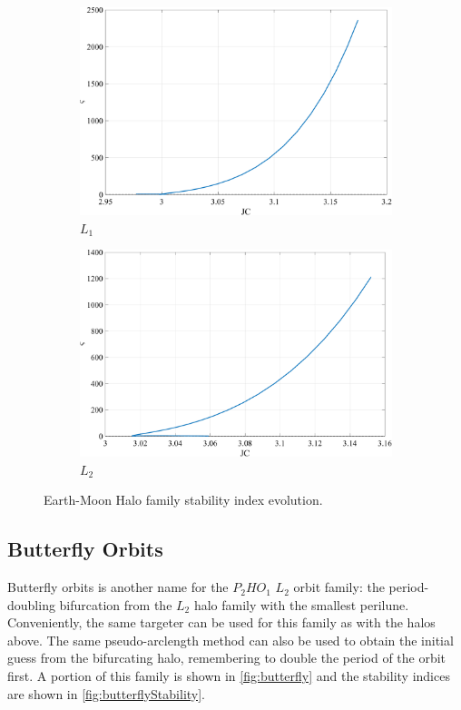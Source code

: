\begin{figure}[ht]
    \begin{subfigure}[h]{0.4\linewidth}
        \includegraphics[width=\textwidth]{figures/L1HaloStability.pdf}
        \caption{$L_{1}$}
    \end{subfigure}
    \hfill
    \begin{subfigure}[h]{0.4\linewidth}
        \includegraphics[width=\textwidth]{figures/L2HaloStability.pdf}
        \caption{$L_{2}$}
    \end{subfigure}
    \caption{Earth-Moon Halo family stability index evolution.}
    \label{fig:haloStability}
\end{figure}

\subsection{Butterfly Orbits}
Butterfly orbits is another name for the $P_{2}HO_{1}$ $L_{2}$ orbit family: the period-doubling
bifurcation from the $L_{2}$ halo family with the smallest perilune\cite{ZimovanSpreen:2021}.
Conveniently, the same targeter can be used for this family as with the halos above. The same
pseudo-arclength method can also be used to obtain the initial guess from the bifurcating halo,
remembering to double the period of the orbit first. A portion of this family is shown in
\cref{fig:butterfly} and the stability indices are shown in \cref{fig:butterflyStability}.

